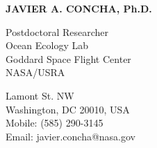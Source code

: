 \documentclass[11pt]{res} %
\begin{document}
 
{\centering \Large \bf JAVIER A. CONCHA, Ph.D.\par} %
\vspace{0.3in}                                         
\begin{multicols}{2}
{\raggedright Postdoctoral Researcher\\ Ocean Ecology Lab\\Goddard Space Flight Center \\ NASA/USRA\\}
{ Lamont St. NW\\Washington, DC 20010, USA\\Mobile: (585) 290-3145\\Email: javier.concha@nasa.gov\\}
\end{multicols}
\vspace{-0.4in} 
\hrulefill
\end{document}
